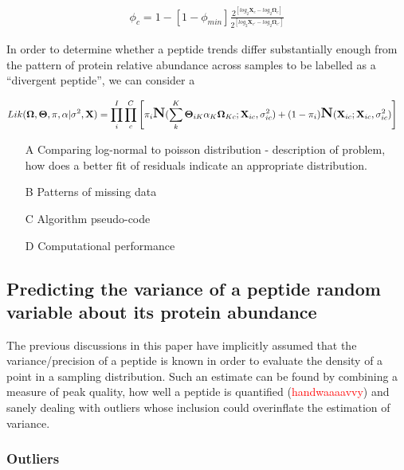 \documentclass[12pt]{article}
\begin{document}
\begin{align}
\phi_{c} = 1 - [1 - \phi_{min}]\frac{2^{[log_{2}\textbf{X}_{c} - log_{2}\boldsymbol\Omega_{c}]}}{2^{[log_{2}\textbf{X}_{c'} - log_{2}\boldsymbol\Omega_{c'}]}}\label{covamount}
\end{align}

In order to determine whether a peptide trends differ substantially enough from the pattern of protein relative abundance across samples to be labelled as a ``divergent peptide'', we can consider a

\begin{align}
Lik(\mathbf{\Omega}, \mathbf{\Theta}, \pi, \alpha | \sigma^{2}, \textbf{X}) &= \prod_{i}^{I}\prod_{c}^{C}\left[ \pi_{i}\mbox{\Large \textbf{N}}(\sum_{k}^{K}\mathbf{\Theta}_{iK}\alpha_{K}\mathbf{\Omega}_{Kc} ; \textbf{X}_{ic}, \sigma^{2}_{ic}) + (1-\pi_{i})\mbox{\Large \textbf{N}}( \textbf{X}_{ic}; \textbf{X}_{ic}, \sigma^{2}_{ic}) \right]
\end{align}

\color{red}
\begin{itemize}
\item[A] Comparing log-normal to poisson distribution - description of problem, how does a better fit of residuals indicate an appropriate distribution.
\item[B] Patterns of missing data
\item[C] Algorithm pseudo-code
\item[D] Computational performance
\end{itemize}
\color{black}

\subsection*{Predicting the variance of a peptide random variable about its protein abundance}

The previous discussions in this paper have implicitly assumed that the variance/precision of a peptide is known in order to evaluate the density of a point in a sampling distribution.  Such an estimate can be found by combining a measure of peak quality, how well a peptide is quantified (\textcolor{red}{handwaaaavvy}) and sanely dealing with outliers whose inclusion could overinflate the estimation of variance.

\subsubsection*{Outliers}
\end{document}
